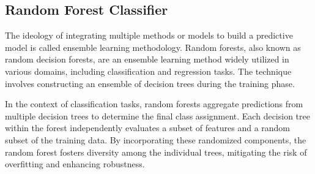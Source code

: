 



\subsection{Random Forest Classifier}\label{sec:sectionrfc}
The ideology of integrating multiple methods or models to build a predictive model is called ensemble learning methodology\citep{Rokach2010}. Random forests, also known as random decision forests, are an ensemble learning method widely utilized in various domains, including classification and regression tasks. The technique involves constructing an ensemble of decision trees during the training phase. 

In the context of classification tasks, random forests aggregate predictions from multiple decision trees to determine the final class assignment. Each decision tree within the forest independently evaluates a subset of features and a random subset of the training data. By incorporating these randomized components, the random forest fosters diversity among the individual trees, mitigating the risk of overfitting and enhancing robustness.

